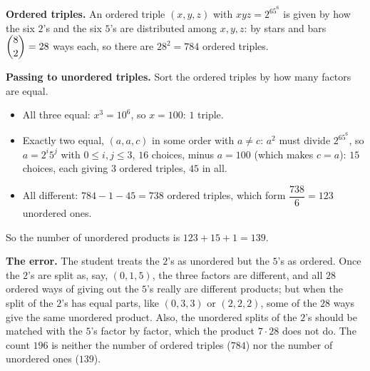 \textbf{Ordered triples.} An ordered triple $(x,y,z)$ with $xyz=2^65^6$ is given by how the six $2$'s and the six $5$'s are distributed among $x,y,z$: by stars and bars $\dbinom82=28$ ways each, so there are $28^2=784$ ordered triples.

\textbf{Passing to unordered triples.} Sort the ordered triples by how many factors are equal.
\begin{itemize}
\item All three equal: $x^3=10^6$, so $x=100$: $1$ triple.
\item Exactly two equal, $(a,a,c)$ in some order with $a\ne c$: $a^2$ must divide $2^65^6$, so $a=2^i5^j$ with $0\le i,j\le3$, $16$ choices, minus $a=100$ (which makes $c=a$): $15$ choices, each giving $3$ ordered triples, $45$ in all.
\item All different: $784-1-45=738$ ordered triples, which form $\dfrac{738}{6}=123$ unordered ones.
\end{itemize}
So the number of unordered products is $123+15+1=\boxed{139}$.

\textbf{The error.} The student treats the $2$'s as unordered but the $5$'s as ordered. Once the $2$'s are split as, say, $(0,1,5)$, the three factors are different, and all $28$ ordered ways of giving out the $5$'s really are different products; but when the split of the $2$'s has equal parts, like $(0,3,3)$ or $(2,2,2)$, some of the $28$ ways give the same unordered product. Also, the unordered splits of the $2$'s should be matched with the $5$'s factor by factor, which the product $7\cdot28$ does not do. The count $196$ is neither the number of ordered triples ($784$) nor the number of unordered ones ($139$).
